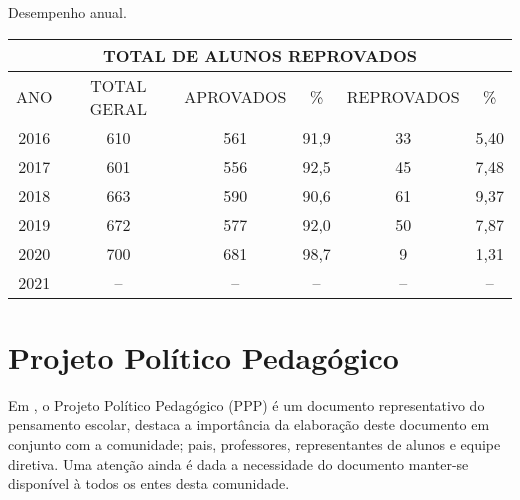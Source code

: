 \begin{quadro}[ht!]
    \centering
    \caption{Desempenho anual.}
    \label{qua:totalReprovacao}
    \begin{tabular}{|cccccc|}
        \hline
        \multicolumn{6}{|c|}{\textbf{TOTAL DE ALUNOS REPROVADOS}}                                                                                     \\ \hline
        \multicolumn{1}{|c|}{ANO} & \multicolumn{1}{c|}{TOTAL GERAL} & \multicolumn{1}{c|}{APROVADOS} & \multicolumn{1}{c|}{\%} & \multicolumn{1}{c|}{REPROVADOS} & \% \\ \hline
        \multicolumn{1}{|c|}{2016} & \multicolumn{1}{c|}{610} & \multicolumn{1}{c|}{561} & \multicolumn{1}{c|}{91,9} & \multicolumn{1}{c|}{33} & 5,40 \\ \hline
        \multicolumn{1}{|c|}{2017} & \multicolumn{1}{c|}{601} & \multicolumn{1}{c|}{556} & \multicolumn{1}{c|}{92,5} & \multicolumn{1}{c|}{45} & 7,48 \\ \hline
        \multicolumn{1}{|c|}{2018} & \multicolumn{1}{c|}{663} & \multicolumn{1}{c|}{590} & \multicolumn{1}{c|}{90,6} & \multicolumn{1}{c|}{61} & 9,37 \\ \hline
        \multicolumn{1}{|c|}{2019} & \multicolumn{1}{c|}{672} & \multicolumn{1}{c|}{577} & \multicolumn{1}{c|}{92,0} & \multicolumn{1}{c|}{50} & 7,87 \\ \hline
        \multicolumn{1}{|c|}{2020} & \multicolumn{1}{c|}{700} & \multicolumn{1}{c|}{681} & \multicolumn{1}{c|}{98,7} & \multicolumn{1}{c|}{9}  & 1,31 \\ \hline
        \multicolumn{1}{|c|}{2021} & \multicolumn{1}{c|}{--}  & \multicolumn{1}{c|}{--}  & \multicolumn{1}{c|}{--}   & \multicolumn{1}{c|}{--} & --   \\ \hline
    \end{tabular}
\end{quadro}

\section{Projeto Político Pedagógico}
Em \cite{CARVALHOAMP:2012a}, o Projeto Político Pedagógico (PPP) é um documento representativo do pensamento escolar, destaca a importância da elaboração deste documento em conjunto com a comunidade; pais, professores, representantes de alunos e equipe diretiva. Uma atenção ainda é dada a necessidade do documento manter-se disponível à todos os entes desta comunidade. 

